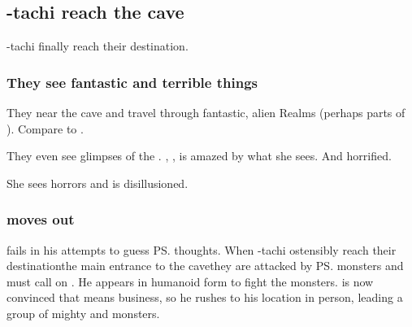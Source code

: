 \begin{garbage}
\subsection{\Shilred-tachi reach the cave}
\Shilred-tachi finally reach their destination. 





\subsubsection{They see fantastic and terrible things}
They near the cave and travel through fantastic, alien Realms (perhaps parts of \hs{\Machai}). Compare to . 

They even see glimpses of the \xss. 
\Shilred{}, , is amazed by what she sees. And horrified.


She sees horrors and is disillusioned. 







\subsubsection{\Teshrial{} moves out}
\Teshrial{} fails in his attempts to guess \ps{\Ishnaruchaefir} thoughts. 
When \Shilred-tachi ostensibly reach their destination\dash the main entrance to the cave\dash they are attacked by \ps{\Teshrial} monsters and must call on \Ishnaruchaefir. 
He appears in humanoid form to fight the monsters. 
\Teshrial{} is now convinced that \Ishnaruchaefir{} means business, so he rushes to his location in person, leading a group of mighty \banes{} and monsters. 






\end{garbage}

